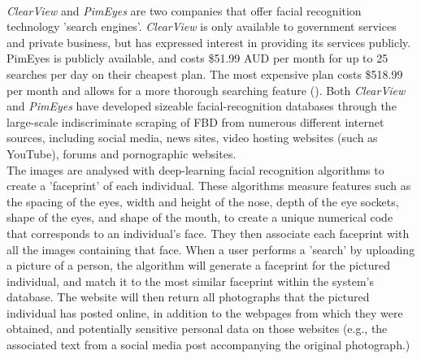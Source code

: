 \documentclass{article}
\begin{document}
\vspace{0.3cm} \\
\textit{ClearView} and \textit{PimEyes} are two companies that offer facial recognition technology 'search engines'. \textit{ClearView} is only available to government services and private business, but has expressed interest in providing its services publicly. PimEyes is publicly available, and costs \$51.99 AUD per month for up to 25 searches per day on their cheapest plan. The most expensive plan costs \$518.99 per month and allows for a more thorough searching feature (\cite{PimEyes2024}). Both \textit{ClearView} and \textit{PimEyes} have developed sizeable facial-recognition databases through the large-scale indiscriminate scraping of FBD from numerous different internet sources, including social media, news sites, video hosting websites (such as YouTube), forums and pornographic websites.
\vspace{0.3cm} \\
The images are analysed with deep-learning facial recognition algorithms to create a 'faceprint' of each individual. These algorithms measure features such as the spacing of the eyes, width and height of the nose, depth of the eye sockets, shape of the eyes, and shape of the mouth, to create a unique numerical code that corresponds to an individual's face. They then associate each faceprint with all the images containing that face. When a user performs a 'search' by uploading a picture of a person, the algorithm will generate a faceprint for the pictured individual, and match it to the most similar faceprint within the system's database. The website will then return all photographs that the pictured individual has posted online, in addition to the webpages from which they were obtained, and potentially sensitive personal data on those websites (e.g., the associated text from a social media post accompanying the original photograph.)
\end{document}
